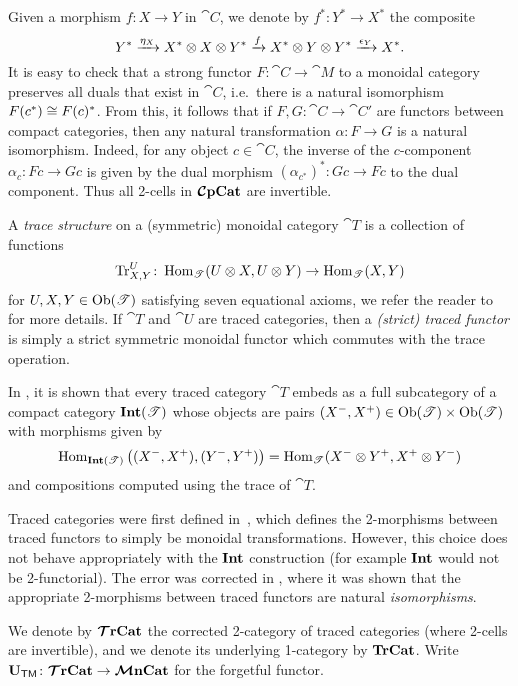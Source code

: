 \documentclass[11pt,oneside,article]{memoir}
\begin{document}
Given a morphism $f\colon X\to Y$ in $\cat{C}$, we denote by $f^*\colon Y^*\to X^*$ the composite
\begin{equation*}
   Y^*\xrightarrow{\eta_X}X^*\otimes X\otimes Y^* \xrightarrow{f}X^*\otimes Y\otimes Y^*\xrightarrow{\epsilon_Y}X^*.
\end{equation*}
It is easy to check that a strong functor $F\colon\cat{C}\to\cat{M}$ to a monoidal category preserves all duals that exist
in $\cat{C}$, i.e.\ there is a natural isomorphism $F(c^*)\cong F(c)^*$. From this, it follows that if $F,G\colon\cat{C}\to\cat{C'}$ are functors between compact categories, then any natural
transformation $\alpha\colon F\to G$ is a natural isomorphism. Indeed, for any object $c\in\cat{C}$,
the inverse of the $c$-component $\alpha_c\colon Fc\to Gc$ is given by the dual morphism
$(\alpha_{c^*})^*\colon Gc\to Fc$ to the dual component. Thus all 2-cells in $\bm{\mathcal{C}}\mathbf{pCat}$ are invertible.

A \emph{trace structure} on a (symmetric) monoidal category $\cat{T}$ is a collection of functions
\begin{equation}
      \label{dia:trace_function}
   \operatorname{Tr}^U_{X,Y}\colon\operatorname{Hom}_{\mathscr{T}}(U\otimes X,U\otimes Y)\to\operatorname{Hom}_{\mathscr{T}}(X,Y)
\end{equation}
for $U,X,Y\in\mathrm{Ob}(\mathscr{T})$ satisfying seven equational axioms, we refer the reader to \cite{JoyalStreetVerity} for more details. If $\cat{T}$ and $\cat{U}$ are traced categories, then a \emph{(strict) traced functor} is simply a strict symmetric monoidal functor which commutes with the trace operation.

In \cite{JoyalStreetVerity}, it is shown that every traced category $\cat{T}$ embeds as a full subcategory of a compact category $\mathbf{Int}(\mathscr{T})$ whose objects are pairs $(X^-,X^+)\in\mathrm{Ob}(\mathscr{T})\times\mathrm{Ob}(\mathscr{T})$ with morphisms given by
\begin{equation*}
   \operatorname{Hom}_{\mathbf{Int}(\mathscr{T})}\big((X^-,X^+),(Y^-,Y^+)\big)
      = \operatorname{Hom}_{\mathscr{T}}(X^-\otimes Y^+,X^+\otimes Y^-)
\end{equation*}
and compositions computed using the trace of $\cat{T}$.
\begin{remark}
      \label{rem:traced_2morphisms}
   Traced categories were first defined in~\cite{JoyalStreetVerity}, which defines
   the 2-morphisms between traced functors to simply be monoidal transformations. However, this choice does
   not behave appropriately with the $\mathbf{Int}$ construction (for example $\mathbf{Int}$ would not be
   2-functorial). The error was corrected in \cite{HK}, where it was shown that the appropriate
   2-morphisms between traced functors are natural \emph{isomorphisms}. 
\end{remark}
We denote by $\bm{\mathcal{T}}\mathbf{rCat}$ the corrected 2-category of traced categories (where 2-cells are invertible), and we denote its underlying 1-category by $\mathbf{TrCat}$. Write $\mathbf{U}_{\mathsf{TM}}\colon\bm{\mathcal{T}}\mathbf{rCat}\to\bm{\mathcal{M}}\mathbf{nCat}$ for the forgetful functor.
\end{document}
